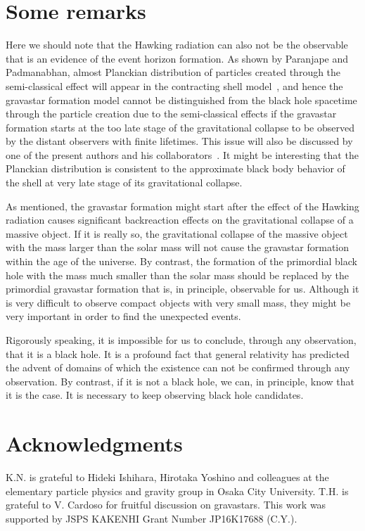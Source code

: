 \documentclass[aps,preprint,preprintnumber,nofootinbib,amsmath,amssymb,ascmac,bm,12pt]{revtex4}
\begin{document}
\section{Some remarks}


Here we should note that the Hawking radiation can also not be the observable 
that is an evidence of the event horizon formation. 
As shown by  Paranjape and Padmanabhan, 
almost Planckian distribution of particles created through the semi-classical effect 
will appear in the contracting shell model~\cite{PP}, 
and hence the gravastar formation model cannot be distinguished from the black hole spacetime 
through the particle creation due to the semi-classical effects if the gravastar formation starts 
at the too late stage of the gravitational collapse to be observed by the distant observers 
with finite lifetimes. 
This issue will also be discussed by one of the present authors and his collaborators~\cite{HMC}.  
It might be interesting that the Planckian distribution is consistent to the approximate black body behavior of 
the shell at very late stage of its gravitational collapse. 

As mentioned, the gravastar formation might start after the effect of the Hawking radiation causes 
significant backreaction effects on the gravitational collapse of a massive object. If it is really so, 
the gravitational collapse of the massive object with the mass larger than the solar mass 
will not cause the gravastar formation within the age of the universe. 
By contrast, the formation of the primordial black hole with the mass much smaller than the solar mass 
should be replaced by the primordial gravastar formation that is, in principle, observable for us\cite{Chirenti-Rezzolla2007,Chirenti-Rezzolla2016}. 
Although it is very difficult to observe compact objects with very small mass, they might be very important 
in order to find the unexpected events. 

Rigorously speaking, it is impossible for us to conclude, through any observation, that it is a black hole.   
It is a profound fact that general relativity has predicted the advent of domains of 
which the existence can not be confirmed through any observation.  
By contrast, if it is not a black hole, we can, in principle, know that it is the case. 
It is necessary to keep observing black hole candidates. 


\section*{Acknowledgments}
K.N. is grateful to Hideki Ishihara, Hirotaka Yoshino and colleagues at the elementary particle physics 
and gravity group in Osaka City University. T.H. is grateful to V. Cardoso for fruitful discussion on gravastars. 
This work was supported by JSPS KAKENHI Grant Number JP16K17688 (C.Y.). 
\end{document}
